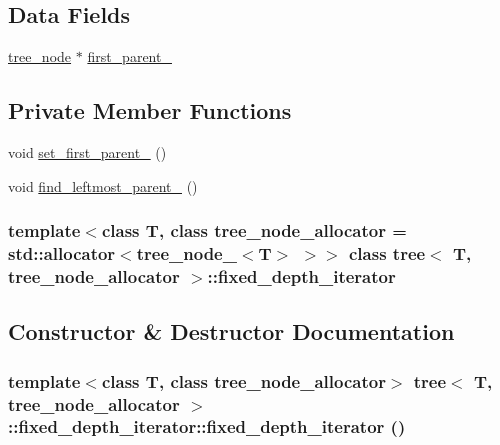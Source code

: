 \subsection*{Data Fields}
\begin{CompactItemize}
\item 
\hyperlink{classtree__node__}{tree\_\-node} $\ast$ \hyperlink{classtree_1_1fixed__depth__iterator_5f6c92f12c4281e94e950ccd70833985}{first\_\-parent\_\-}
\end{CompactItemize}
\subsection*{Private Member Functions}
\begin{CompactItemize}
\item 
void \hyperlink{classtree_1_1fixed__depth__iterator_d4a7326054e3770ab7b2e98d70cbc31e}{set\_\-first\_\-parent\_\-} ()
\item 
void \hyperlink{classtree_1_1fixed__depth__iterator_aa76856fbd25e52e8e0104ba744b0246}{find\_\-leftmost\_\-parent\_\-} ()
\end{CompactItemize}
\subsubsection*{template$<$class T, class tree\_\-node\_\-allocator = std::allocator$<$tree\_\-node\_\-$<$T$>$ $>$$>$ class tree$<$ T, tree\_\-node\_\-allocator $>$::fixed\_\-depth\_\-iterator}



\subsection{Constructor \& Destructor Documentation}
\hypertarget{classtree_1_1fixed__depth__iterator_10f1d20ec2b62e4370a560ebcd84ad54}{
\subsubsection{\setlength{\rightskip}{0pt plus 5cm}template$<$class T, class tree\_\-node\_\-allocator$>$ {\bf tree}$<$ T, tree\_\-node\_\-allocator $>$::fixed\_\-depth\_\-iterator::fixed\_\-depth\_\-iterator ()}}
\label{classtree_1_1fixed__depth__iterator_10f1d20ec2b62e4370a560ebcd84ad54}


